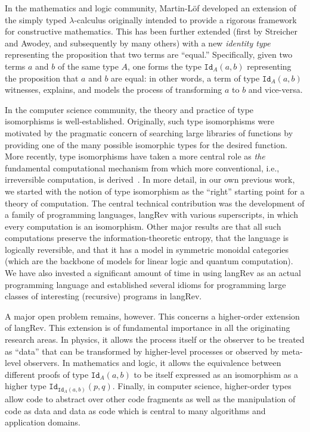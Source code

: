 \documentclass{llncs}
\begin{document}
In the mathematics and logic community, Martin-L\"of developed an extension
of the simply typed $\lambda$-calculus originally intended to provide a
rigorous framework for constructive mathematics. This has been further
extended (first by Streicher and Awodey, and subsequently by many others)
with a new \emph{identity type} representing the proposition
that two terms are ``equal.'' Specifically, given two terms $a$ and $b$ of
the same type $A$, one forms the type $\texttt{Id}_A(a,b)$ representing the
proposition that $a$ and $b$ are equal: in other words, a term of type
$\texttt{Id}_A(a,b)$ witnesses, explains, and models the process of
transforming $a$ to $b$ and vice-versa.

In the computer science community, the theory and practice of type
isomorphisms is well-established. Originally, such type isomorphisms were
motivated by the pragmatic concern of searching large libraries of functions
by providing one of the many possible isomorphic types for the desired
function. More recently, type isomorphisms have taken a more central role as
\emph{the} fundamental computational mechanism from which more conventional,
i.e., irreversible computation, is derived~\cite{infeffects}. In more detail,
in our own previous work, we started with the notion of type isomorphism as
the ``right'' starting point for a theory of computation. The central
technical contribution was the development of a family of programming
languages, {{langRev}} with various superscripts, in which every computation
is an isomorphism. Other major results are that all such computations
preserve the information-theoretic entropy, that the language is logically
reversible, and that it has a model in symmetric monoidal categories (which
are the backbone of models for linear logic and quantum computation). We have
also invested a significant amount of time in using {{langRev}} as an actual
programming language and established several idioms for programming large
classes of interesting (recursive) programs in {{langRev}}.

A major open problem remains, however. This concerns a higher-order extension
of {{langRev}}. This extension is of fundamental importance in all the
originating research areas. In physics, it allows the process itself or the
observer to be treated as ``data'' that can be transformed by higher-level
processes or observed by meta-level observers. In mathematics and logic, it
allows the equivalence between different proofs of type $\texttt{Id}_A(a,b)$
to be itself expressed as an isomorphism as a higher type
$\texttt{Id}_{\texttt{Id}_A(a,b)}(p,q)$. Finally, in computer science,
higher-order types allow code to abstract over other code fragments as well
as the manipulation of code as data and data as code which is central to many
algorithms and application domains.
\end{document}
